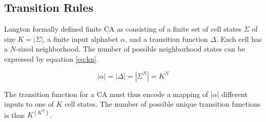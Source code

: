 %

%

\subsection{Transition Rules}
\label{sec:transitions}
Langton \cite{langton-1990} formally defined finite CA as consisting of a finite set of cell states $\Sigma$ of size $K = |\Sigma|$,
a finite input alphabet $\alpha$, and a transition function $\Delta$.
Each cell has a $N$-sized neighborhood.
The number of possible neighborhood states can be expressed by equation \eqref{eq:kn}.

\begin{equation}\label{eq:kn}
    |\alpha| = |\Delta| = |\Sigma^N| = K^N
\end{equation}

The transition function for a CA must thus encode a mapping of $|\alpha|$ different inputs to one of $K$ cell states.
The number of possible unique transition functions is thus $K^{(K^N)}$.

